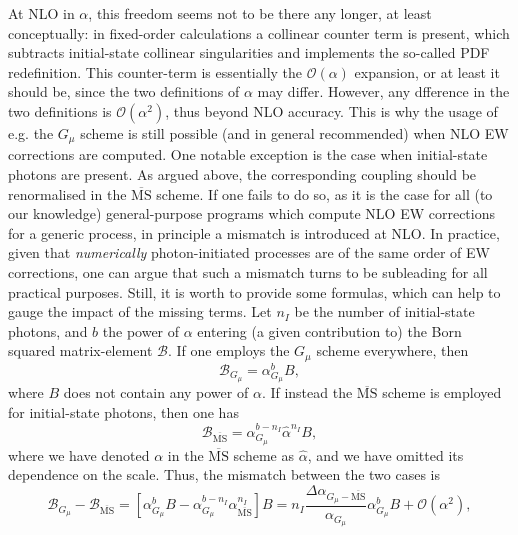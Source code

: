 At NLO in $\alpha$, this freedom seems not to be there any longer, at least conceptually: in fixed-order calculations a collinear counter term is present,
which subtracts initial-state collinear singularities and implements the so-called PDF redefinition. This counter-term is
essentially the $\mathcal O(\alpha)$ expansion, or at least it should be, since the two definitions of $\alpha$ may differ. However, any
dfference in the two definitions is $\mathcal O(\alpha^2)$, thus beyond NLO accuracy. This is why the usage of e.g. the $G_\mu$ scheme
is still possible (and in general recommended) when NLO EW corrections are computed. One notable exception
is the case when initial-state photons are present. As argued above, the corresponding coupling should be renormalised in the $\overline{\textrm{MS}}$ scheme.
If one fails to do so, as it is the case for all (to our knowledge) general-purpose programs which compute NLO EW corrections for a generic process, in
principle a mismatch is introduced at NLO. In practice, given that \emph{numerically} photon-initiated processes are of the same order of EW corrections,
one can argue that such a mismatch turns to be subleading for all practical purposes. Still, it is worth to provide some formulas, which can help to gauge the impact of the missing terms.
Let $n_I$ be the number of initial-state photons, and $b$ the power of $\alpha$ entering (a given contribution to) the Born squared matrix-element $\mathcal B$. If
one employs the $G_\mu$ scheme everywhere, then
\begin{equation}
    \mathcal B_{G_\mu}= \alpha_{G_\mu}^b B,
\end{equation}
where $B$ does not contain any power of $\alpha$. If instead the $\overline{\textrm{MS}}$ scheme is employed for initial-state photons, then one has
\begin{equation}
    \mathcal B_{\overline{\textrm{MS}}}= \alpha_{G_\mu}^{b-n_I} \hat \alpha^{n_I} B,
\end{equation}
where we have denoted $\alpha$ in the $\overline{\textrm{MS}}$ scheme as $\hat\alpha$, and we have omitted its dependence on the scale.
Thus, the mismatch between the two cases is
\begin{equation}
    \mathcal B_{G_\mu} - \mathcal B_{\overline{\textrm{MS}}}  = \left[ \alpha_{G_\mu}^b B - \alpha_{G_\mu}^{b-n_I} \alpha_{\overline{\textrm{MS}}}^{n_I} \right] B =
    n_I \frac{\Delta \alpha_{G_\mu-\overline{\textrm{MS}}}}{\alpha_{G_\mu}} \alpha_{G_\mu}^b B  + \mathcal O (\alpha^2),
\end{equation}
